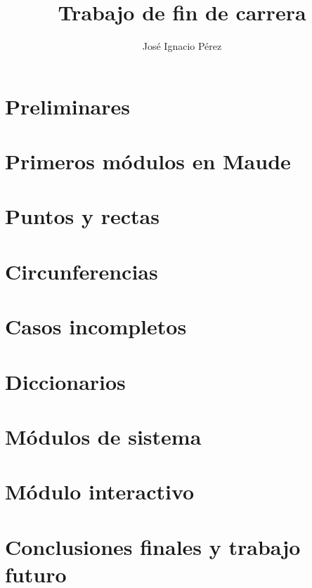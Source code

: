 \documentclass[12pt,a4paper,draft]{book}
\author{Jos\'e Ignacio P\'erez}
\title{Trabajo de fin de carrera}
\begin{document}
\newcommand{\codesize}{\small}

\frontmatter

\tableofcontents
\chapter{Preliminares}\label{cap.0}


\mainmatter
\chapter{Primeros módulos en Maude}\label{cap.1}

\chapter{Puntos y rectas}\label{cap.2}

\chapter{Circunferencias}\label{cap.3}

\chapter{Casos incompletos}\label{cap.4}

\chapter{Diccionarios}\label{cap.5}

\chapter{Módulos de sistema}\label{cap.6}

\chapter{Módulo interactivo}\label{cap.7}

\chapter{Conclusiones finales y trabajo futuro}\label{cap.10}

\backmatter

\end{document}
